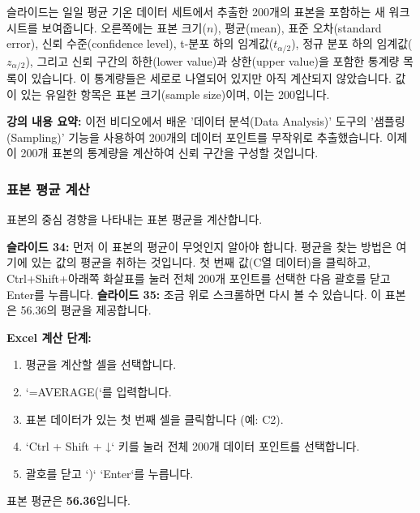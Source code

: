 \documentclass[11pt,a4paper]{article}
\begin{document}
\begin{tcolorbox}[title=슬라이드 39: 뉴욕 일일 기온 샘플 Excel 시트 (2/22)]
슬라이드는 일일 평균 기온 데이터 세트에서 추출한 200개의 표본을 포함하는 새 워크시트를 보여줍니다. 오른쪽에는 표본 크기($n$), 평균(mean), 표준 오차(standard error), 신뢰 수준(confidence level), t-분포 하의 임계값($t_{\alpha/2}$), 정규 분포 하의 임계값($z_{\alpha/2}$), 그리고 신뢰 구간의 하한(lower value)과 상한(upper value)을 포함한 통계량 목록이 있습니다. 이 통계량들은 세로로 나열되어 있지만 아직 계산되지 않았습니다. 값이 있는 유일한 항목은 표본 크기(sample size)이며, 이는 200입니다.
\end{tcolorbox}

\textbf{강의 내용 요약:}
이전 비디오에서 배운 '데이터 분석(Data Analysis)' 도구의 '샘플링(Sampling)' 기능을 사용하여 200개의 데이터 포인트를 무작위로 추출했습니다. 이제 이 200개 표본의 통계량을 계산하여 신뢰 구간을 구성할 것입니다.

\subsubsection{표본 평균 계산}

표본의 중심 경향을 나타내는 표본 평균을 계산합니다.

\begin{tcolorbox}[title=슬라이드 34-35: 뉴욕 일일 기온 샘플 Excel 시트 (3/22 - 4/22)]
\textbf{슬라이드 34:} 먼저 이 표본의 평균이 무엇인지 알아야 합니다. 평균을 찾는 방법은 여기에 있는 값의 평균을 취하는 것입니다. 첫 번째 값(C열 데이터)을 클릭하고, Ctrl+Shift+아래쪽 화살표를 눌러 전체 200개 포인트를 선택한 다음 괄호를 닫고 Enter를 누릅니다.
\textbf{슬라이드 35:} 조금 위로 스크롤하면 다시 볼 수 있습니다. 이 표본은 56.36의 평균을 제공합니다.
\end{tcolorbox}

\textbf{Excel 계산 단계:}
\begin{enumerate}
    \item 평균을 계산할 셀을 선택합니다.
    \item `=AVERAGE(`를 입력합니다.
    \item 표본 데이터가 있는 첫 번째 셀을 클릭합니다 (예: C2).
    \item `Ctrl + Shift + ↓` 키를 눌러 전체 200개 데이터 포인트를 선택합니다.
    \item 괄호를 닫고 `)` `Enter`를 누릅니다.
\end{enumerate}
\begin{tcolorbox}[colback=mygreen!10!white, colframe=mygreen!75!black, title=계산 결과: 표본 평균]
표본 평균은 \textbf{56.36}입니다.
\end{tcolorbox}
\end{document}
